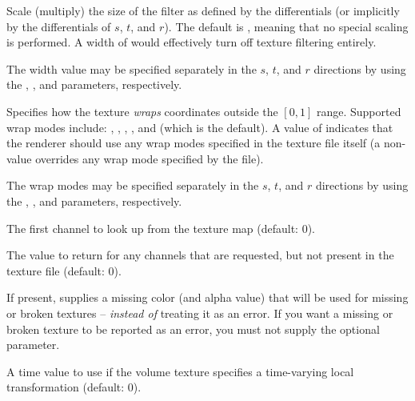 \documentclass[11pt,letterpaper]{book}
\begin{document}
\vspace{12pt}
Scale (multiply) the size of the filter as defined by the differentials
(or implicitly by the differentials of $s$, $t$, and $r$).  The default is
{}, meaning that no special scaling is performed.  A width of
{} would effectively turn off texture filtering entirely.

The width value may be specified separately in the $s$, $t$, and $r$
directions by using the , , and  parameters,
respectively.
\apiend
\vspace{-16pt}

\vspace{12pt}

Specifies how the texture \emph{wraps} coordinates outside the $[0,1]$
range.  Supported wrap modes include: , ,
, , and  (which is the default).  A
value of  indicates that the renderer should use any wrap
modes specified in the texture file itself (a non- value
overrides any wrap mode specified by the file).

The wrap modes may be specified separately in the $s$, $t$, and $r$
directions by using the , , and 
parameters, respectively.
\apiend
\vspace{-16pt}

\vspace{12pt}
The first channel to look up from the texture map (default: 0).
\apiend
\vspace{-16pt}

\vspace{12pt}
The value to return for any channels that are requested,
but not present in the texture file (default: 0).
\apiend
\vspace{-16pt}

\vspace{12pt}
If present, supplies a missing color (and alpha value) that will
be used for missing or broken textures -- \emph{instead of} treating
it as an error.  If you want a missing or broken texture to be reported
as an error, you must not supply the optional 
parameter.
\apiend
\vspace{-16pt}

\vspace{12pt}
A time value to use if the volume texture specifies a time-varying
local transformation (default: 0).
\apiend
\vspace{-16pt}
\end{document}
